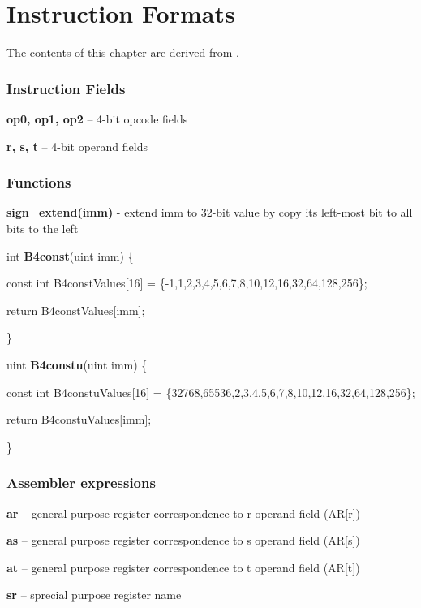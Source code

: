 \chapter{Instruction Formats}

The contents of this chapter are derived from \cite{gcc,binutils,qemu}.


\subsection {Instruction Fields}

  \textbf{op0, op1, op2} – 4-bit opcode fields

  \textbf{r, s, t} – 4-bit operand fields

\subsection {Functions}


\textbf{sign\_extend(imm)} - extend imm to 32-bit value by copy its left-most bit to all bits to the left 

int \textbf{ B4const}(uint imm) \{
	
	const int B4constValues[16] = \{-1,1,2,3,4,5,6,7,8,10,12,16,32,64,128,256\};
	
	return  B4constValues[imm];
	
\}


uint \textbf{B4constu}(uint imm) \{
	
	const int B4constuValues[16] = \{32768,65536,2,3,4,5,6,7,8,10,12,16,32,64,128,256\};
	
	return  B4constuValues[imm];
	
\}


\subsection {Assembler expressions}

\textbf{ar} – general purpose register correspondence to r operand field (AR[r])

\textbf{as} – general purpose register correspondence to s operand field (AR[s])

\textbf{at} – general purpose register correspondence to t operand field (AR[t])

\textbf{sr} – sprecial purpose register name


\setlength{\tabcolsep}{8pt}

